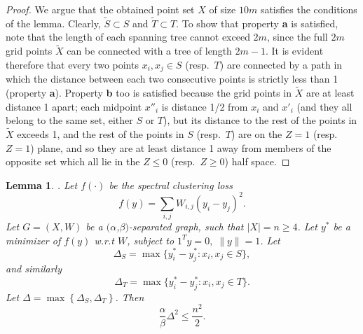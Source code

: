 \documentclass{article} %
\newtheorem{lemma}[theorem]{Lemma}
\begin{document}
\begin{proof}
We argue that the obtained point set $X$ of size $10m$ satisfies the conditions of the lemma. Clearly, $\tilde{S} \subset S$ and $\tilde{T} \subset T$. To show that property \textbf{a} is satisfied, note that the length of each spanning tree cannot exceed $2m$, since the full $2m$ grid points $\tilde X$ can be connected with a tree of length $2m-1$. It is evident therefore that every two points $x_i,x_j \in S$ (resp.~$T$) are connected by a path in which the distance between each two consecutive points is strictly less than 1 (property \textbf{a}). Property \textbf{b} too is satisfied because the grid points in $\tilde X$ are at least distance 1 apart; each midpoint $x''_i$  is distance 1/2 from $x_i$ and $x'_i$ (and they all belong to the same set, either $S$ or $T$), but its distance to the rest of the points in $\tilde X$ exceeds 1, and the rest of the points in $S$ (resp.~$T$) are on the $Z=1$ (resp.~$Z=1$) plane, and so they are at least distance 1 away from members of the opposite set which all lie in the $Z \le 0$ (resp.~$Z \ge 0$) half space.
\end{proof}





\begin{lemma}\label{lem:ineq}.
Let $f(\cdot)$ be the spectral clustering loss
$$f(y) = \sum_{i,j} W_{i,j}(y_i-y_j)^2.$$
Let $G=(X,W)$ be a $(\alpha$,$\beta)$-separated graph, such that $|X| =n \ge 4$. Let $y^*$ be a minimizer of $f(y)$ w.r.t $W$, subject to $1^Ty=0,\; \|y\|=1$.
Let
$$\Delta_S = \max\{y^*_i-y^*_j: x_i,x_j\in S\},$$
and similarly
$$\Delta_T = \max\{y^*_i-y^*_j: x_i,x_j\in T\}.$$
Let $\Delta = \max\left\{\Delta_S,\Delta_T\right\}$.
Then
$$ \frac{\alpha}{\beta}\Delta^2 \le \frac{n^2}{2}.$$
\end{lemma}
\end{document}
